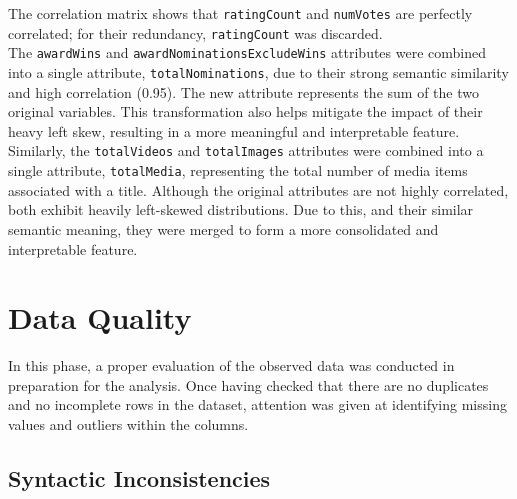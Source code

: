 The correlation matrix shows that \texttt{ratingCount} and \texttt{numVotes} are perfectly correlated;
for their redundancy, \texttt{ratingCount} was discarded.\\

The \texttt{awardWins} and \texttt{awardNominationsExcludeWins} attributes were combined into a single
attribute, \texttt{totalNominations}, due to their strong semantic similarity and high correlation (0.95).
The new attribute represents the sum of the two original variables. This transformation also helps
mitigate the impact of their heavy left skew, resulting in a more meaningful and interpretable feature.\\


Similarly, the \texttt{totalVideos} and \texttt{totalImages} attributes were combined into a single
attribute, \texttt{totalMedia}, representing the total number of media items associated with a title.
Although the original attributes are not highly correlated, both exhibit heavily left-skewed distributions.
Due to this, and their similar semantic meaning, they were merged to form a more consolidated and
interpretable feature.



\section{Data Quality}\label{sec:data_quality}
In this phase, a proper evaluation of the observed data was conducted in preparation for the analysis.
Once having checked that there are no duplicates and no incomplete rows in the dataset, 
attention was given at identifying missing values and outliers within the columns.



\subsection{Syntactic Inconsistencies}



